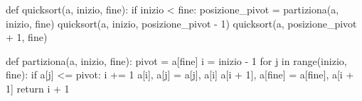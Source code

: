 \begin{unipdcode}[language=Python]
def quicksort(a, inizio, fine):
    if inizio < fine:
        posizione_pivot = partiziona(a, inizio, fine)
        quicksort(a, inizio, posizione_pivot - 1)
        quicksort(a, posizione_pivot + 1, fine)

def partiziona(a, inizio, fine):
    pivot = a[fine]
    i = inizio - 1
    for j in range(inizio, fine):
        if a[j] <= pivot:
            i += 1
            a[i], a[j] = a[j], a[i]
    a[i + 1], a[fine] = a[fine], a[i + 1]
    return i + 1
\end{unipdcode}
